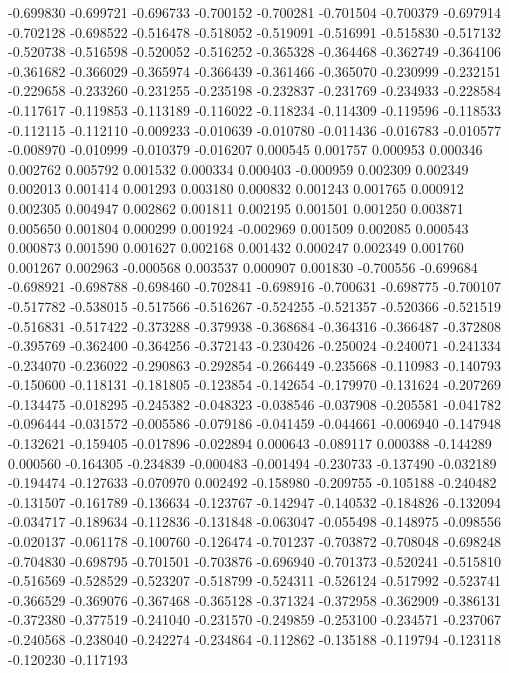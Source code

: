 -0.699830
-0.699721
-0.696733
-0.700152
-0.700281
-0.701504
-0.700379
-0.697914
-0.702128
-0.698522
-0.516478
-0.518052
-0.519091
-0.516991
-0.515830
-0.517132
-0.520738
-0.516598
-0.520052
-0.516252
-0.365328
-0.364468
-0.362749
-0.364106
-0.361682
-0.366029
-0.365974
-0.366439
-0.361466
-0.365070
-0.230999
-0.232151
-0.229658
-0.233260
-0.231255
-0.235198
-0.232837
-0.231769
-0.234933
-0.228584
-0.117617
-0.119853
-0.113189
-0.116022
-0.118234
-0.114309
-0.119596
-0.118533
-0.112115
-0.112110
-0.009233
-0.010639
-0.010780
-0.011436
-0.016783
-0.010577
-0.008970
-0.010999
-0.010379
-0.016207
0.000545
0.001757
0.000953
0.000346
0.002762
0.005792
0.001532
0.000334
0.000403
-0.000959
0.002309
0.002349
0.002013
0.001414
0.001293
0.003180
0.000832
0.001243
0.001765
0.000912
0.002305
0.004947
0.002862
0.001811
0.002195
0.001501
0.001250
0.003871
0.005650
0.001804
0.000299
0.001924
-0.002969
0.001509
0.002085
0.000543
0.000873
0.001590
0.001627
0.002168
0.001432
0.000247
0.002349
0.001760
0.001267
0.002963
-0.000568
0.003537
0.000907
0.001830
-0.700556
-0.699684
-0.698921
-0.698788
-0.698460
-0.702841
-0.698916
-0.700631
-0.698775
-0.700107
-0.517782
-0.538015
-0.517566
-0.516267
-0.524255
-0.521357
-0.520366
-0.521519
-0.516831
-0.517422
-0.373288
-0.379938
-0.368684
-0.364316
-0.366487
-0.372808
-0.395769
-0.362400
-0.364256
-0.372143
-0.230426
-0.250024
-0.240071
-0.241334
-0.234070
-0.236022
-0.290863
-0.292854
-0.266449
-0.235668
-0.110983
-0.140793
-0.150600
-0.118131
-0.181805
-0.123854
-0.142654
-0.179970
-0.131624
-0.207269
-0.134475
-0.018295
-0.245382
-0.048323
-0.038546
-0.037908
-0.205581
-0.041782
-0.096444
-0.031572
-0.005586
-0.079186
-0.041459
-0.044661
-0.006940
-0.147948
-0.132621
-0.159405
-0.017896
-0.022894
0.000643
-0.089117
0.000388
-0.144289
0.000560
-0.164305
-0.234839
-0.000483
-0.001494
-0.230733
-0.137490
-0.032189
-0.194474
-0.127633
-0.070970
0.002492
-0.158980
-0.209755
-0.105188
-0.240482
-0.131507
-0.161789
-0.136634
-0.123767
-0.142947
-0.140532
-0.184826
-0.132094
-0.034717
-0.189634
-0.112836
-0.131848
-0.063047
-0.055498
-0.148975
-0.098556
-0.020137
-0.061178
-0.100760
-0.126474
-0.701237
-0.703872
-0.708048
-0.698248
-0.704830
-0.698795
-0.701501
-0.703876
-0.696940
-0.701373
-0.520241
-0.515810
-0.516569
-0.528529
-0.523207
-0.518799
-0.524311
-0.526124
-0.517992
-0.523741
-0.366529
-0.369076
-0.367468
-0.365128
-0.371324
-0.372958
-0.362909
-0.386131
-0.372380
-0.377519
-0.241040
-0.231570
-0.249859
-0.253100
-0.234571
-0.237067
-0.240568
-0.238040
-0.242274
-0.234864
-0.112862
-0.135188
-0.119794
-0.123118
-0.120230
-0.117193
